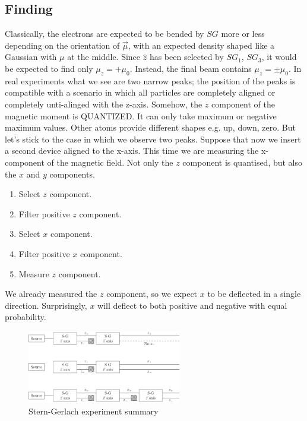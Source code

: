   \subsection{Finding}
  Classically, the electrons are expected to be bended by $SG$ more or less depending on the orientation of $\vec{\mu}$, with an expected density shaped like a Gaussian with $\mu$ at the middle.
  Since $\hat{z}$ has been selected by $SG_1$, $SG_3$, it would be expected to find only $\mu_z = + \mu_0$. Instead, the final beam contains $\mu_z =\pm \mu_0$.
  In real experiments what we see are two narrow peaks; the position of the peaks is compatible with a scenario in which all particles are completely aligned or completely unti-alinged with the z-axis.
  Somehow, the $z$ component of the magnetic moment is QUANTIZED.
  It can only take maximum or negative maximum values.
  Other atoms provide different shapes e.g. up, down, zero.
  But let’s stick to the case in which we observe two peaks.
  Suppose that now we insert a second device aligned to the x-axis.
  This time we are measuring the x-component of the magnetic field.
  Not only the $z$ component is quantised, but also the $x$ and $y$ components.

  \begin{multicols}{2}
    \begin{enumerate}
      \item Select $z$ component.
      \item Filter positive $z$ component.
      \item Select $x$ component.
      \item Filter positive $x$ component.
      \item Measure $z$ component.
    \end{enumerate}
  \end{multicols}

  We already measured the $z$ component, so we expect $x$ to be deflected in a single direction. Surprisingly, $x$ will deflect to both positive and negative with equal probability.

\begin{figure}[h!]
    \centering
    \includegraphics[clip, width=0.6\textwidth]{stern_ger.png}
    \caption{\label{fig:stern_ger} Stern-Gerlach experiment summary}
\end{figure}
